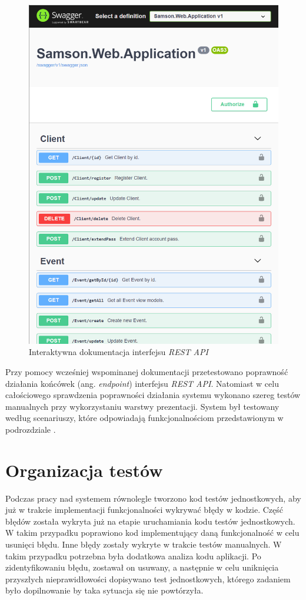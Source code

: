 \documentclass[a4paper,twoside,12pt]{book}
\newcommand{\obcy}[1]{\emph{#1}}
\newcommand{\ang}[1]{{\selectlanguage{british}\obcy{#1}}}
\begin{document}
\begin{figure}[htbp]
	\centering
	\includegraphics[width=1\linewidth]{../zrzuty_ekranu/testy/swagger}
	\caption{Interaktywna dokumentacja interfejsu \textit{REST API}}
	\label{fig:swagger}
\end{figure}
Przy pomocy wcześniej wspominanej dokumentacji przetestowano poprawność działania końcówek (ang. \ang{endpoint}) interfejsu \textit{REST API}. Natomiast w celu całościowego sprawdzenia poprawności działania systemu wykonano szereg testów manualnych przy wykorzystaniu warstwy prezentacji. System był testowany według scenariuszy, które odpowiadają funkcjonalnościom przedstawionym w podrozdziale \textbf{}.

\section{Organizacja testów}
Podczas pracy nad systemem równolegle tworzono kod testów jednostkowych, aby już w trakcie implementacji funkcjonalności wykrywać błędy w kodzie. Część błędów została wykryta już na etapie uruchamiania kodu testów jednostkowych. W takim przypadku poprawiono kod implementujący daną funkcjonalność w celu usunięci błędu. Inne błędy zostały wykryte w trakcie testów manualnych. W takim przypadku potrzebna była dodatkowa analiza kodu aplikacji. Po zidentyfikowaniu błędu, zostawał on usuwany, a następnie w celu uniknięcia przyszłych nieprawidłowości dopisywano test jednostkowych, którego zadaniem było dopilnowanie by taka sytuacja się nie powtórzyła.
\end{document}
